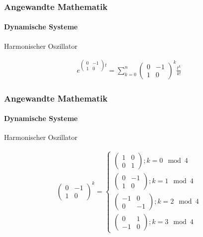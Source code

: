 \documentclass{beamer}
\begin{document}
 \begin{frame}
    \frametitle{Angewandte Mathematik}
\framesubtitle{Dynamische Systeme }
\begin{block}{Harmonischer Oszillator}

\begin{align*}
 e^{ \begin{pmatrix}
        0 & -1  \\ 1 & 0
    \end{pmatrix} t } = \sum_{k= 0}^{n} \begin{pmatrix}
    0 & -1  \\ 1 & 0
\end{pmatrix}^{k} \frac{t^k}{k!} 
\end{align*}

\end{block}
 \end{frame}


 \begin{frame}
    \frametitle{Angewandte Mathematik}
\framesubtitle{Dynamische Systeme }
\begin{block}{Harmonischer Oszillator}

\begin{align*}
\begin{pmatrix}
        0 & -1  \\ 1 & 0
    \end{pmatrix}^{k}  = \begin{cases} 
        \begin{pmatrix}
            1 & 0  \\ 0 & 1
        \end{pmatrix}; k = 0 \mod 4 \\
        \begin{pmatrix}
            0 & -1  \\ 1 & 0
        \end{pmatrix}; k = 1 \mod 4 \\
        \begin{pmatrix}
            -1 & 0  \\ 0 & -1
        \end{pmatrix}; k = 2 \mod 4 \\
        \begin{pmatrix}
            0 & 1  \\ -1 & 0
        \end{pmatrix}; k = 3 \mod 4
    \end{cases}
\end{align*}
\end{block}
 \end{frame}
\end{document}
